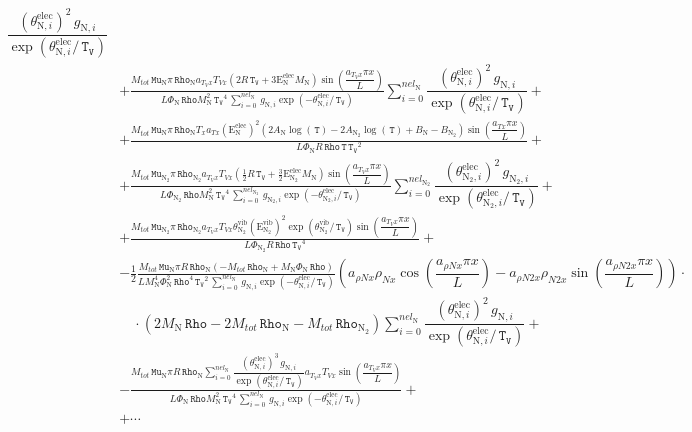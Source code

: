 \documentclass[10pt]{article}
\newcommand{\Rho}{\,\mathtt{Rho}}
\newcommand{\T}{\,\mathtt{T}}
\newcommand{\TV}{\,\mathtt{T_V}}
\newcommand{\N}{\text{N}}
\newcommand{\elec}{\text{elec}}
\newcommand{\vib}{\text{vib}}
\newcommand{\E}{\text{E}}
\newcommand{\Mu}{\, \mathtt{Mu}}
\newcommand{\eelecNden}{\,\sum_{i=0}^{nel_{\N}}   \, g_{\N,i}   \exp \left( -\theta^{\elec}_{\N,i} / \TV  \right) }
\newcommand{\eelecNdoisden}{\,\sum_{i=0}^{nel_{\N_2}}  \, g_{\N_2,i}   \exp \left( -\theta^{\elec}_{\N_2,i} /  \TV \right)}
\begin{document}
\begin{equation*}
\begin{split}
\dfrac{ \left( \theta^{\elec}_{\N,i} \right)^2   \, g_{\N,i} }{ \exp \left( \theta^{\elec}_{\N,i} / \TV \right)} \\ 
%
&+ \frac{M_{tot} \Mu_{\N} \pi \Rho_{\N} a_{T_V x} T_{Vx} \left(2 R \TV + 3 \E^{\elec}_{\N} M_{\N}\right) \sin\left(\dfrac{a_{T_V
x} \pi x}{L}\right)}{L \Phi_{\N} \Rho M_{\N}^{2} \TV^{4} \eelecNden } \sum_{i=0}^{nel_{\N}} \dfrac{ \left( \theta^{\elec}_{\N,i}
\right)^2   \, g_{\N,i} }{ \exp \left( \theta^{\elec}_{\N,i} / \TV \right)}+\\ 
%
&+ \frac{M_{tot} \Mu_{\N} \pi \Rho_{\N} T_{x} a_{Tx} \left( \E^{\elec}_{\N} \right)^2 ( 2 A_{\N} \log(\T) - 2 A_{\N_2} \log(\T)
+B_{\N} - B_{\N_2} ) \sin\left(\dfrac{a_{Tx} \pi x}{L}\right)}{L \Phi_{\N} R \Rho \T \TV^{2}} +\\ 
%
&+ \frac{M_{tot} \Mu_{\N_2} \pi \Rho_{\N_2} a_{T_V x} T_{Vx} \left(\frac{1}{2} R \TV + \frac{3}{2} \E^{\elec}_{\N_2} M_{\N}\right)
\sin\left(\dfrac{a_{T_V x} \pi x}{L}\right)}{L \Phi_{\N_2} \Rho M_{\N}^{2} \TV^{4} \eelecNdoisden }  \sum_{i=0}^{nel_{\N_2}}
\dfrac{ \left( \theta^{\elec}_{\N_2,i} \right)^2   \, g_{\N_2,i} }{ \exp \left( \theta^{\elec}_{\N_2,i} /  \TV \right)} +\\ 
%
&+ \frac{M_{tot} \Mu_{\N_2} \pi \Rho_{\N_2} a_{T_V x} T_{Vx} \theta^{\vib}_{\N_2} \left( \E^{\vib}_{\N_2} \right)^2 \exp\left(
\theta^{\vib}_{\N_2} / \TV \right) \sin\left(\dfrac{a_{T_V x} \pi x}{L}\right)}{L \Phi_{\N_2} R \Rho \TV^{4}} +\\ 
%
&- \frac{1}{2}\frac{M_{tot} \Mu_{\N} \pi R \Rho_{\N}\left(- M_{tot} \Rho_{\N} + M_{\N} \Phi_{\N} \Rho\right) }{L M_{\N}^{4}
\Phi_{\N}^{2} \Rho^{4} \TV^{2} \eelecNden } \left(a_{\rho N x} \rho_{N x} \cos\left(\dfrac{a_{\rho N x} \pi x}{L}\right) - a_{\rho
N2 x} \rho_{N2 x} \sin\left(\dfrac{a_{\rho N2 x} \pi x}{L}\right)\right)\cdot\\
 &\quad \cdot \left(2 M_{\N} \Rho - 2 M_{tot} \Rho_{\N} - M_{tot} \Rho_{\N_2}\right) \sum_{i=0}^{nel_{\N}} \dfrac{ \left(
\theta^{\elec}_{\N,i} \right)^2   \, g_{\N,i} }{ \exp \left( \theta^{\elec}_{\N,i} / \TV \right)} +\\ 
%
&- \frac{M_{tot} \Mu_{\N} \pi R \Rho_{\N}  \sum_{i=0}^{nel_{\N}} \dfrac{ \left( \theta^{\elec}_{\N,i} \right)^3   \, g_{\N,i} }{
\exp \left( \theta^{\elec}_{\N,i} / \TV \right)} a_{T_V x} T_{Vx} \sin\left(\dfrac{a_{T_V x} \pi x}{L}\right)}{L \Phi_{\N} \Rho
M_{\N}^{2} \TV^{4} \eelecNden } +\\ 
%
%
&+\cdots \\
\end{split}
\end{equation*}
\end{document}
